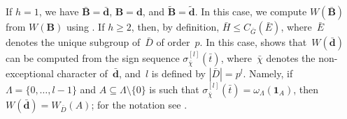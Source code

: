 \documentclass[12pt]{amsart}
\newcommand{\bB}{{\mathbf{B}}}
\newcommand{\bd}{{\mathbf{d}}}
\theoremstyle{theorem}
\theoremstyle{definition}
\theoremstyle{remark}
\begin{document}
If $h = 1$, we have $\bar{\bB} = \bar{\bd}$, $\bB = \bd$, and 
$\tilde{\bB} = \tilde{\bd}$. In this case, we compute $W( \bar{\bB} )$ from 
$W( \bB )$ using \cite[Lemma~$2.4.2$(c)]{HL25}. If $h \geq 2$, then, by 
definition, $\bar{H} \leq C_{\bar{G}}( \bar{E} )$, where~$\bar{E}$ denotes the
unique subgroup of~$\bar{D}$ of order~$p$. In this case,
\cite[Remark~$2.3.3$]{HL25} shows that~$W( \bar{\bd} )$ can be 
computed from the sign sequence $\sigma_{\bar{\chi}}^{[l]}( \bar{t} )$, 
where~$\bar{\chi}$ denotes the non-exceptional character of~$\bar{\bd}$, and~$l$
is defined by $|\bar{D}| = p^l$. Namely, if $\Lambda = \{ 0, \ldots , l - 1 \}$
and $A \subseteq \Lambda \setminus \{ 0 \}$ is such that 
$\sigma_{\bar{\chi}}^{[l]}( \bar{t} ) = \omega_{\Lambda}( \mathbf{1}_A )$, then 
$W( \bar{\bd} ) = W_{\bar{D}}( A )$; for the notation see 
\cite[Definitions~$2.1.1$,~$2.1.2$]{HL25}.
\end{document}
